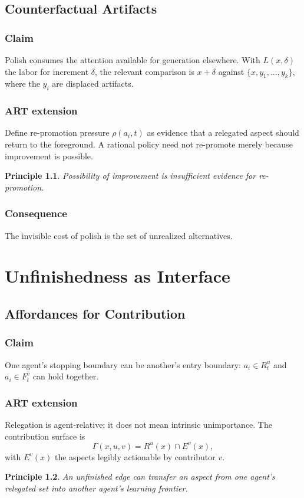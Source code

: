 \documentclass[11pt,openany]{book}
\newtheorem{principle}{Principle}[chapter]
\begin{document}
\chapter{Counterfactual Artifacts}
\section{Claim}
Polish consumes the attention available for generation elsewhere. With
$L(x,\delta)$ the labor for increment $\delta$, the relevant comparison is
$x+\delta$ against $\{x,y_1,\ldots,y_k\}$, where the $y_i$ are displaced
artifacts.
\section{ART extension}
Define re-promotion pressure $\rho(a_i,t)$ as evidence that a relegated
aspect should return to the foreground. A rational policy need not
re-promote merely because improvement is possible.
\begin{principle}
Possibility of improvement is insufficient evidence for re-promotion.
\end{principle}
\section{Consequence}
The invisible cost of polish is the set of unrealized alternatives.

\part{Unfinishedness as Interface}

\chapter{Affordances for Contribution}
\section{Claim}
One agent's stopping boundary can be another's entry boundary:
$a_i\in R^u_t$ and $a_i\in F^v_t$ can hold together.
\section{ART extension}
Relegation is agent-relative; it does not mean intrinsic unimportance. The
contribution surface is
\[
  \Gamma(x,u,v)=R^u(x)\cap E^v(x),
\]
with $E^v(x)$ the aspects legibly actionable by contributor $v$.
\begin{principle}
An unfinished edge can transfer an aspect from one agent's relegated set
into another agent's learning frontier.
\end{principle}
\end{document}
